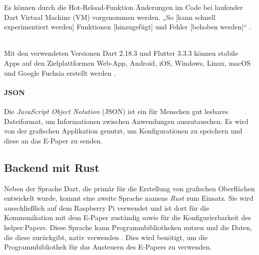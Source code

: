 \documentclass[10pt]{article}
\begin{document}
Es können durch die Hot-Reload-Funktion Änderungen im Code bei laufender Dart Virtual Machine (VM) vorgenommen werden. „So [kann schnell experimentiert werden] Funktionen [hinzugefügt] und Fehler [behoben werden]“ \cite{Was_ist_Flutter?}.

\mbox{}
\\
Mit den verwendeten Versionen Dart 2.18.3 und Flutter 3.3.3 können stabile Apps auf den Zielplattformen Web-App, Android, iOS, Windows, Linux, macOS und Google Fuchsia erstellt werden \cite{HeiseOnline_Dart_Flutter}.

\paragraph{JSON}\label{JSON}
Die \textit{JavaScript Object Notation} (JSON) ist ein für Menschen gut lesbares Dateiformat, um Informationen zwischen Anwendungen auszutauschen. Es wird von der grafischen Applikation genutzt, um Konfigurationen zu speichern und diese an das E-Paper zu senden\cite{json}.

\subsection{Backend mit Rust}\label{rust}
Neben der Sprache Dart, die primär für die Erstellung von grafischen Oberflächen entwickelt wurde, kommt eine zweite Sprache namens \textit{Rust} zum Einsatz. Sie wird ausschließlich auf dem Raspberry Pi verwendet und ist dort für die Kommunikation mit dem E-Paper zuständig sowie für die Konfigurierbarkeit des helper:Papers.
Diese Sprache kann Programmbibliotheken\footnotemark{} nutzen und die Daten, die diese zurückgibt, nativ verwenden \cite{rust-c}. Dies wird benötigt, um die Programmbibliothek für das Ansteuern des E-Papers zu verwenden.
\end{document}

